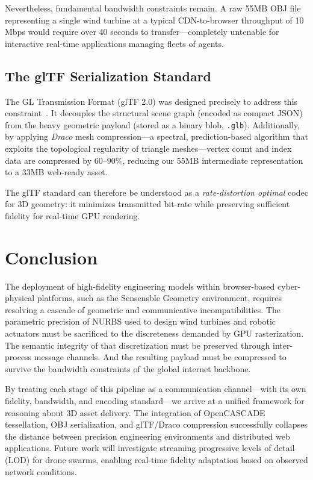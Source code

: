 \documentclass[conference]{IEEEtran}
\begin{document}
Nevertheless, fundamental bandwidth constraints remain. A raw 55MB OBJ file representing a single wind turbine at a typical CDN-to-browser throughput of 10 Mbps would require over 40 seconds to transfer---completely untenable for interactive real-time applications managing fleets of agents.

\subsection{The glTF Serialization Standard}

The GL Transmission Format (glTF 2.0) was designed precisely to address this constraint~\cite{b_gltf}. It decouples the structural scene graph (encoded as compact JSON) from the heavy geometric payload (stored as a binary blob, \texttt{.glb}). Additionally, by applying \textit{Draco} mesh compression---a spectral, prediction-based algorithm that exploits the topological regularity of triangle meshes---vertex count and index data are compressed by $60$--$90\%$, reducing our 55MB intermediate representation to a 33MB web-ready asset.

The glTF standard can therefore be understood as a \textit{rate-distortion optimal} codec for 3D geometry: it minimizes transmitted bit-rate while preserving sufficient fidelity for real-time GPU rendering.

\section{Conclusion}
\label{sec:conclusion}

The deployment of high-fidelity engineering models within browser-based cyber-physical platforms, such as the Sensensble Geometry environment, requires resolving a cascade of geometric and communicative incompatibilities. The parametric precision of NURBS used to design wind turbines and robotic actuators must be sacrificed to the discreteness demanded by GPU rasterization. The semantic integrity of that discretization must be preserved through inter-process message channels. And the resulting payload must be compressed to survive the bandwidth constraints of the global internet backbone.

By treating each stage of this pipeline as a communication channel---with its own fidelity, bandwidth, and encoding standard---we arrive at a unified framework for reasoning about 3D asset delivery. The integration of OpenCASCADE tessellation, OBJ serialization, and glTF/Draco compression successfully collapses the distance between precision engineering environments and distributed web applications. Future work will investigate streaming progressive levels of detail (LOD) for drone swarms, enabling real-time fidelity adaptation based on observed network conditions.
\end{document}
